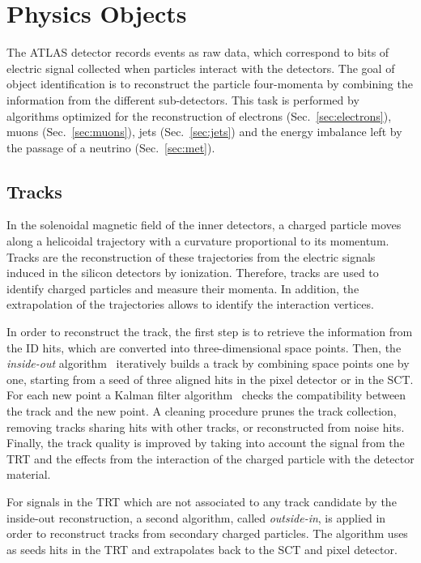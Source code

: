 \chapter{Physics Objects}
\label{sec:objects}

The ATLAS detector records events as raw data, 
which correspond to bits of electric signal collected 
when particles interact with the detectors. 
The goal of object identification is to reconstruct the particle four-momenta
by combining the information from the different sub-detectors.
This task is performed by algorithms optimized for the reconstruction of
electrons (Sec.~\ref{sec:electrons}), muons (Sec.~\ref{sec:muons}), 
jets (Sec.~\ref{sec:jets}) and the energy imbalance left
by the passage of a neutrino (Sec.~\ref{sec:met}).

\section{Tracks}
\label{sec:tracks}

In the solenoidal magnetic field of the inner detectors,
a charged particle moves along a helicoidal trajectory with a 
curvature proportional to its momentum.
Tracks are the reconstruction of these trajectories from the electric 
signals induced in the silicon detectors by ionization.
Therefore, tracks are used to identify charged particles and measure
their momenta. In addition, the extrapolation of the trajectories
allows to identify the interaction vertices.
 
In order to reconstruct the track, the first step is to retrieve the information from
the ID hits, which are converted into three-dimensional space points. Then, 
the {\it inside-out} algorithm~\cite{insideoutalgo} iteratively builds
a track by combining space points one by one, starting from a
seed of three aligned hits in the pixel detector or in the SCT.
For each new point a Kalman filter algorithm~\cite{kalmanfilter}
checks the compatibility between the track and the new point. 
A cleaning procedure prunes the track collection, removing 
tracks sharing hits with other tracks, or reconstructed from noise hits. 
Finally, the track quality is improved by taking into account the signal
from the TRT and the effects from the interaction
of the charged particle with the detector material. 

For signals in the TRT which are not associated to any track candidate
by the inside-out reconstruction, a second algorithm,
called {\it outside-in}, is applied in order to
reconstruct tracks from secondary charged particles. 
The algorithm uses as seeds hits in the TRT
and extrapolates back to the SCT and pixel detector.


